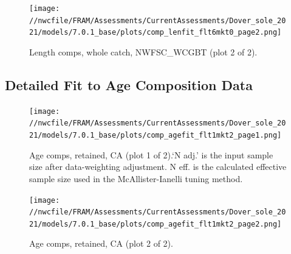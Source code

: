 \documentclass[11pt,
  english,
  a4paper,
]{article}
\begin{document}
\tagmcend\tagstructend


\begin{figure}
\centering
\texttt{[image: //nwcfile/FRAM/Assessments/CurrentAssessments/Dover\_sole\_2021/models/7.0.1\_base/plots/comp\_lenfit\_flt6mkt0\_page2.png]}
\caption{Length comps, whole catch, NWFSC\_WCGBT (plot 2 of 2).\label{fig:comp_lenfit_flt6mkt0_page2}}
\end{figure}

\tagmcend\tagstructend

\clearpage


\hypertarget{age-fit-data}{%
\subsection{Detailed Fit to Age Composition Data}\label{age-fit-data}}

\leavevmode\tagmcend\tagstructend


\begin{figure}
\centering
\texttt{[image: //nwcfile/FRAM/Assessments/CurrentAssessments/Dover\_sole\_2021/models/7.0.1\_base/plots/comp\_agefit\_flt1mkt2\_page1.png]}
\caption{Age comps, retained, CA (plot 1 of 2).`N adj.' is the input sample size after data-weighting adjustment. N eff. is the calculated effective sample size used in the McAllister-Ianelli tuning method.\label{fig:comp_agefit_flt1mkt2_page1}}
\end{figure}

\tagmcend\tagstructend


\begin{figure}
\centering
\texttt{[image: //nwcfile/FRAM/Assessments/CurrentAssessments/Dover\_sole\_2021/models/7.0.1\_base/plots/comp\_agefit\_flt1mkt2\_page2.png]}
\caption{Age comps, retained, CA (plot 2 of 2).\label{fig:comp_agefit_flt1mkt2_page2}}
\end{figure}
\end{document}
